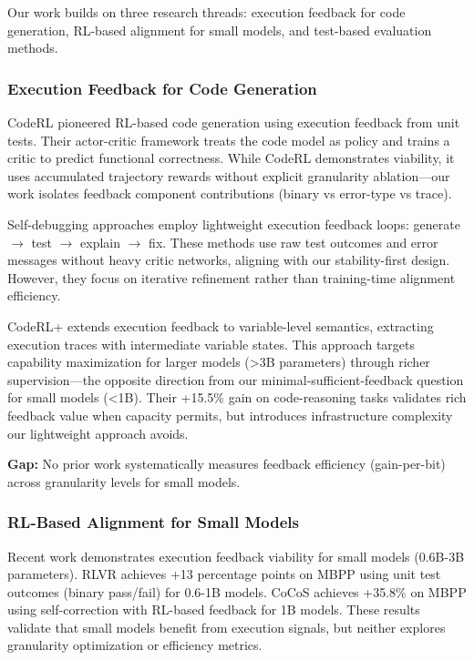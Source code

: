 
Our work builds on three research threads: execution feedback for code generation, RL-based alignment for small models, and test-based evaluation methods.

\subsubsection{Execution Feedback for Code Generation}

CodeRL pioneered RL-based code generation using execution feedback from unit tests. Their actor-critic framework treats the code model as policy and trains a critic to predict functional correctness. While CodeRL demonstrates viability, it uses accumulated trajectory rewards without explicit granularity ablation---our work isolates feedback component contributions (binary vs error-type vs trace).

Self-debugging approaches employ lightweight execution feedback loops: generate $\rightarrow$ test $\rightarrow$ explain $\rightarrow$ fix. These methods use raw test outcomes and error messages without heavy critic networks, aligning with our stability-first design. However, they focus on iterative refinement rather than training-time alignment efficiency.

CodeRL+ extends execution feedback to variable-level semantics, extracting execution traces with intermediate variable states. This approach targets capability maximization for larger models (>3B parameters) through richer supervision---the opposite direction from our minimal-sufficient-feedback question for small models (<1B). Their +15.5\% gain on code-reasoning tasks validates rich feedback value when capacity permits, but introduces infrastructure complexity our lightweight approach avoids.

\textbf{Gap:} No prior work systematically measures feedback efficiency (gain-per-bit) across granularity levels for small models.

\subsubsection{RL-Based Alignment for Small Models}

Recent work demonstrates execution feedback viability for small models (0.6B-3B parameters). RLVR achieves +13 percentage points on MBPP using unit test outcomes (binary pass/fail) for 0.6-1B models. CoCoS achieves +35.8\% on MBPP using self-correction with RL-based feedback for 1B models. These results validate that small models benefit from execution signals, but neither explores granularity optimization or efficiency metrics.

